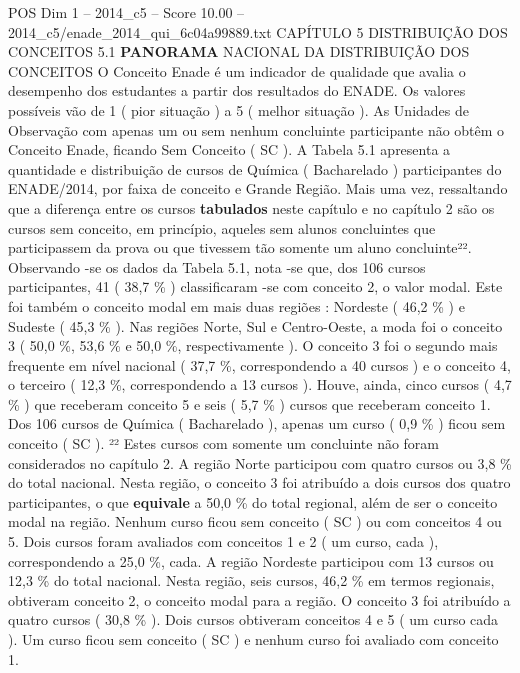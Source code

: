 \begin{textsample}{POS Dim 1 – 2014\_c5 – Score 10.00 – 2014\_c5/enade\_2014\_qui\_6c04a99889.txt}  \label{ex:f1_pos_102}
CAPÍTULO 5 DISTRIBUIÇÃO DOS CONCEITOS 5.1 \textbf{PANORAMA} NACIONAL DA DISTRIBUIÇÃO DOS CONCEITOS O Conceito Enade é um indicador de qualidade que avalia o desempenho dos estudantes a partir dos resultados do ENADE.
Os valores possíveis vão de 1 ( pior situação ) a 5 ( melhor situação ).
As Unidades de Observação com apenas um ou sem nenhum concluinte participante não obtêm o Conceito Enade, ficando Sem Conceito ( SC ).
A Tabela 5.1 apresenta a quantidade e distribuição de cursos de Química ( Bacharelado ) participantes do ENADE/2014, por faixa de conceito e Grande Região.
Mais uma vez, ressaltando que a diferença entre os cursos \textbf{tabulados} neste capítulo e no capítulo 2 são os cursos sem conceito, em princípio, aqueles sem alunos concluintes que participassem da prova ou que tivessem tão somente um aluno concluinte²².
Observando -se os dados da Tabela 5.1, nota -se que, dos 106 cursos participantes, 41 ( 38,7 \% ) classificaram -se com conceito 2, o valor modal.
Este foi também o conceito modal em mais duas regiões : Nordeste ( 46,2 \% ) e Sudeste ( 45,3 \% ).
Nas regiões Norte, Sul e Centro-Oeste, a moda foi o conceito 3 ( 50,0 \%, 53,6 \% e 50,0 \%, respectivamente ).
O conceito 3 foi o segundo mais frequente em nível nacional ( 37,7 \%, correspondendo a 40 cursos ) e o conceito 4, o terceiro ( 12,3 \%, correspondendo a 13 cursos ).
Houve, ainda, cinco cursos ( 4,7 \% ) que receberam conceito 5 e seis ( 5,7 \% ) cursos que receberam conceito 1.
Dos 106 cursos de Química ( Bacharelado ), apenas um curso ( 0,9 \% ) ficou sem conceito ( SC ). ²² Estes cursos com somente um concluinte não foram considerados no capítulo 2.
A região Norte participou com quatro cursos ou 3,8 \% do total nacional.
Nesta região, o conceito 3 foi atribuído a dois cursos dos quatro participantes, o que \textbf{equivale} a 50,0 \% do total regional, além de ser o conceito modal na região.
Nenhum curso ficou sem conceito ( SC ) ou com conceitos 4 ou 5.
Dois cursos foram avaliados com conceitos 1 e 2 ( um curso, cada ), correspondendo a 25,0 \%, cada.
A região Nordeste participou com 13 cursos ou 12,3 \% do total nacional.
Nesta região, seis cursos, 46,2 \% em termos regionais, obtiveram conceito 2, o conceito modal para a região.
O conceito 3 foi atribuído a quatro cursos ( 30,8 \% ).
Dois cursos obtiveram conceitos 4 e 5 ( um curso cada ).
Um curso ficou sem conceito ( SC ) e nenhum curso foi avaliado com conceito 1.

\end{textsample}
